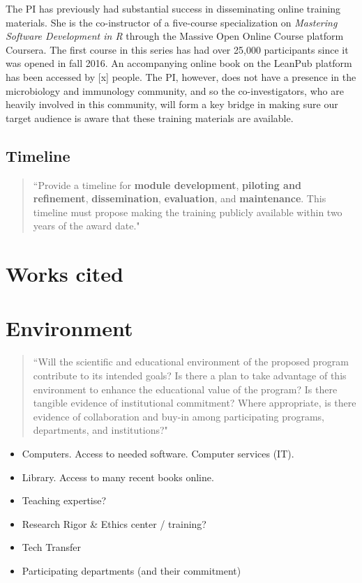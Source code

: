 \documentclass[pdftex,english,11pt,parskip=half]{scrartcl}
\begin{document}
The PI has previously had substantial success in disseminating online training materials. She is the co-instructor of a five-course specialization on \textit{Mastering Software Development in R} through the Massive Open Online Course platform Coursera. The first course in this series has had over 25,000 participants since it was opened in fall 2016. An accompanying online book on the LeanPub platform has been accessed by [x] people. The PI, however, does not have a presence in the microbiology and immunology community, and so the co-investigators, who are heavily involved in this community, will form a key bridge in making sure our target audience is aware that these training materials are available.
    
\subsection{Timeline}

\begin{quotation}
``Provide a timeline for \textbf{module development}, \textbf{piloting and refinement}, \textbf{dissemination}, \textbf{evaluation}, and \textbf{maintenance}.  This timeline must propose making the training publicly available within two years of the award date."
\end{quotation}


\clearpage

\section{Works cited}




\clearpage

\section{Environment}

\begin{quotation}
``Will the scientific and educational environment of the proposed program contribute to its intended goals? Is there a plan to take advantage of this environment to enhance the educational value of the program? Is there tangible evidence of institutional commitment? Where appropriate, is there evidence of collaboration and buy-in among participating programs, departments, and institutions?"
\end{quotation}

\begin{itemize}
\item Computers. Access to needed software. Computer services (IT).
\item Library. Access to many recent books online.
\item Teaching expertise?
\item Research Rigor \& Ethics center / training?
\item Tech Transfer
\item Participating departments (and their commitment)
\end{itemize}
\end{document}
